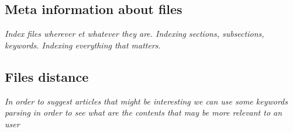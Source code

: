 \subsection{Meta information about files}

\textit{Index files wherever et whatever they are. Indexing sections, subsections,
keywords. Indexing everything that matters.}

\subsection{Files distance}

\textit{In order to suggest articles that might be interesting we can use
some keywords parsing in order to see what are the contents that may be more
relevant to an user}
